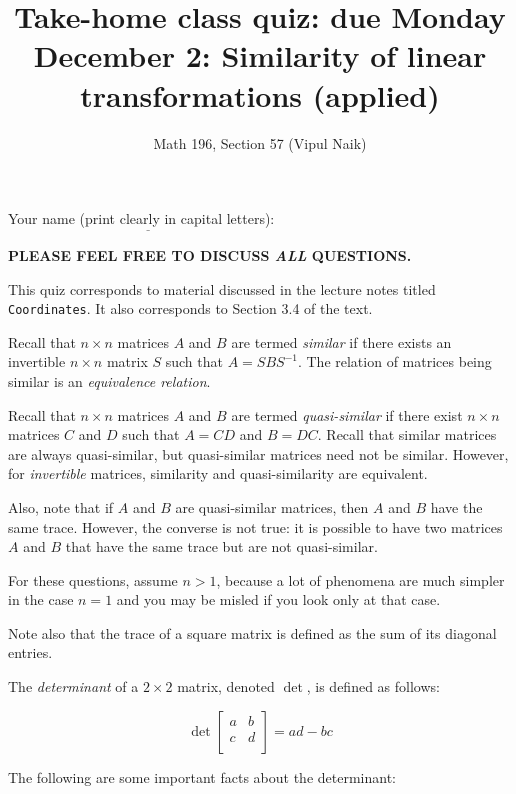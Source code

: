 \documentclass[10pt]{amsart}
\title{Take-home class quiz: due Monday December 2: Similarity of linear transformations (applied)}
\author{Math 196, Section 57 (Vipul Naik)}
\begin{document}
\maketitle

Your name (print clearly in capital letters): $\underline{\qquad\qquad\qquad\qquad\qquad\qquad\qquad\qquad\qquad\qquad}$

{\bf PLEASE FEEL FREE TO DISCUSS {\em ALL} QUESTIONS.}

This quiz corresponds to material discussed in the lecture notes
titled {\tt Coordinates}. It also corresponds to Section 3.4 of the
text.

Recall that $n \times n$ matrices $A$ and $B$ are termed {\em similar}
if there exists an invertible $n \times n$ matrix $S$ such that $A =
SBS^{-1}$. The relation of matrices being similar is an {\em
  equivalence relation}.

Recall that $n \times n$ matrices $A$ and $B$ are termed {\em
  quasi-similar} if there exist $n \times n$ matrices $C$ and $D$ such
that $A = CD$ and $B = DC$. Recall that similar matrices are always
quasi-similar, but quasi-similar matrices need not be
similar. However, for {\em invertible} matrices, similarity and
quasi-similarity are equivalent.

Also, note that if $A$ and $B$ are quasi-similar matrices, then $A$
and $B$ have the same trace. However, the converse is not true: it is
possible to have two matrices $A$ and $B$ that have the same trace but
are not quasi-similar.

For these questions, assume $n > 1$, because a lot of phenomena are
much simpler in the case $n = 1$ and you may be misled if you look
only at that case.

Note also that the trace of a square matrix is defined as the sum of
its diagonal entries.

The {\em determinant} of a $2 \times 2$ matrix, denoted $\det$, is
defined as follows:

$$\det \left[\begin{matrix} a & b \\ c & d \\\end{matrix}\right] = ad - bc$$

The following are some important facts about the determinant:
\end{document}
